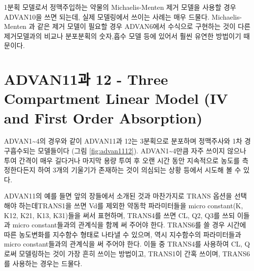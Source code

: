 \documentclass[
  10pt,
]{krantz}
\begin{document}
1분획 모델로서 정맥주입하는 약물의 Michaelis-Menten 제거 모델을 사용할 경우 ADVAN10을 쓰면 되는데, 실제 모델링에서 쓰이는 사례는 매우 드물다. Michaelis-Menten 과 같은 제거 모델이 필요할 경우 ADVAN6에서 수식으로 구현하는 것이 다른 제거모델과의 비교나 분포분획의 숫자,흡수 모델 등에 있어서 훨씬 유연한 방법이기 때문이다.

\hypertarget{advan11uxacfc-12---three-compartment-linear-model-iv-and-first-order-absorption}{%
\section{ADVAN11과 12 - Three Compartment Linear Model (IV and First Order Absorption)}\label{advan11uxacfc-12---three-compartment-linear-model-iv-and-first-order-absorption}}

ADVAN1\textasciitilde4의 경우와 같이 ADVAN11과 12는 3분획으로 분포하며 정맥주사와 1차 경구흡수되는 모델들이다 (그림 \ref{fig:advan1112}). ADVAN1\textasciitilde4만큼 자주 쓰이지 않으나 투여 간격이 매우 길다거나 마지막 용량 투여 후 오랜 시간 동안 지속적으로 농도를 측정한다든지 하여 3개의 기울기가 존재하는 것이 의심되는 상황 등에서 시도해 볼 수 있다.

ADVAN11의 예를 들면 앞의 장들에서 소개된 것과 마찬가지로 TRANS 옵션을 선택해야 하는데TRANS1을 쓰면 Vd를 제외한 약동학 파라미터들을 micro constant(K, K12, K21, K13, K31)들을 써서 표현하며, TRANS4를 쓰면 CL, Q2, Q3를 쓰되 이들과 micro constant들과의 관계식을 함께 써 주어야 한다. TRANS6를 쓸 경우 시간에 따른 농도변화를 지수함수 형태로 나타낼 수 있으며, 역시 지수함수의 파라미터들과 micro constant들과의 관계식을 써 주어야 한다. 이들 중 TRANS4를 사용하여 CL, Q로써 모델링하는 것이 가장 흔히 쓰이는 방법이고, TRANS1이 간혹 쓰이며, TRANS6를 사용하는 경우는 드물다.
\end{document}
